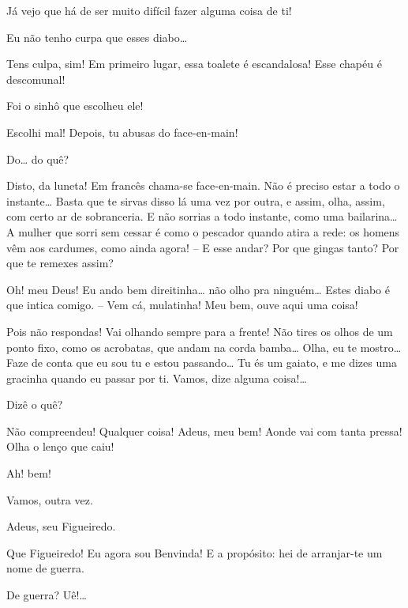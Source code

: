   Já vejo que há de ser muito difícil fazer
alguma coisa de ti!

 Eu não tenho curpa que esses diabo\ldots{}

  Tens culpa, sim! Em primeiro lugar, essa toalete
é escandalosa! Esse chapéu é descomunal!

 Foi o sinhô que escolheu ele!

 Escolhi mal! Depois, tu abusas do face-en-main!

 Do\ldots{} do quê?

 Disto, da luneta! Em francês chama-se face-en-main. Não é
preciso estar a todo o instante\ldots{}  Basta que te sirvas disso lá uma vez por outra, e assim, olha, assim, com certo
ar de sobranceria.  E não sorrias a todo instante, como uma bailarina\ldots{}
A mulher que sorri sem cessar é como o pescador quando atira a rede: os homens vêm
aos cardumes, como ainda agora! -- E esse andar? Por que gingas tanto? Por que
te remexes assim?

  Oh! meu Deus! Eu ando bem direitinha\ldots{} não olho pra
ninguém\ldots{} Estes diabo é que intica comigo. -- Vem cá, mulatinha! Meu bem,
ouve aqui uma coisa!

 Pois não respondas! Vai olhando sempre para a frente! Não
tires os olhos de um ponto fixo, como os acrobatas, que andam na corda bamba\ldots{}
Olha, eu te mostro\ldots{} Faze de conta que eu sou tu e estou passando\ldots{} Tu és um
gaiato, e me dizes uma gracinha quando eu passar por ti.  Vamos, dize alguma coisa!\ldots{}

 Dizê o quê?

  Não compreendeu!  Qualquer coisa! Adeus, meu
bem! Aonde vai com tanta pressa! Olha o lenço que caiu!

 Ah! bem!

 Vamos, outra vez. 

 Adeus, seu Figueiredo.

 Que Figueiredo! Eu agora sou Benvinda! E a propósito: hei de
arranjar-te um nome de guerra.

 De guerra? Uê!\ldots{}

